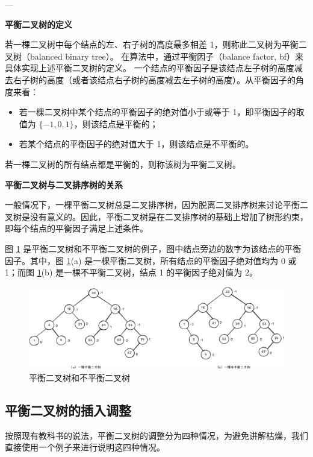 \documentclass[lang=cn,newtx,10pt,scheme=chinese]{elegantbook}
\begin{document}
---

\textbf{平衡二叉树的定义}  

若一棵二叉树中每个结点的左、右子树的高度最多相差 1，则称此二叉树为平衡二叉树（balanced binary tree）。
在算法中，通过平衡因子（balance factor, bf）来具体实现上述平衡二叉树的定义。
一个结点的平衡因子是该结点左子树的高度减去右子树的高度（或者该结点右子树的高度减去左子树的高度）。从平衡因子的角度来看：
\begin{itemize}
  \item 若一棵二叉树中某个结点的平衡因子的绝对值小于或等于 1，即平衡因子的取值为 $\{-1, 0, 1\}$，则该结点是平衡的；
  \item 若某个结点的平衡因子的绝对值大于 1，则该结点是不平衡的。
\end{itemize}

若一棵二叉树的所有结点都是平衡的，则称该树为平衡二叉树。


\textbf{平衡二叉树与二叉排序树的关系}  

一般情况下，一棵平衡二叉树总是二叉排序树，因为脱离二叉排序树来讨论平衡二叉树是没有意义的。因此，平衡二叉树是在二叉排序树的基础上增加了树形约束，即每个结点的平衡因子满足上述条件。

图 \ref{fig:banlanceTree} 是平衡二叉树和不平衡二叉树的例子，图中结点旁边的数字为该结点的平衡因子。其中，图 \ref{fig:banlanceTree}(a) 是一棵平衡二叉树，所有结点的平衡因子绝对值均为 0 或 1；而图 \ref{fig:banlanceTree}(b) 是一棵不平衡二叉树，结点 1 的平衡因子绝对值为 2。
\begin{figure}[h!]
  \centering
  \includegraphics[width=1\textwidth]{./figure/pdf/cropped/balanceTree.pdf}
  \caption{平衡二叉树和不平衡二叉树}
  \label{fig:banlanceTree}

\end{figure}

\subsection{平衡二叉树的插入调整}

按照现有教科书的说法，平衡二叉树的调整分为四种情况，为避免讲解枯燥，我们直接使用一个例子来进行说明这四种情况。
\end{document}
